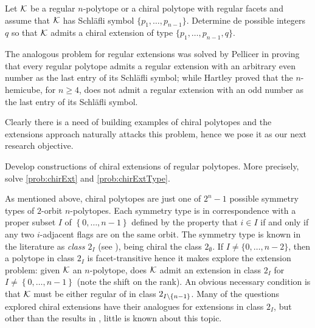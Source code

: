 \documentclass[a4paper,12pt,english]{article}
\begin{document}
\begin{problem} \label{prob:chirExtType}
  Let $\mathcal{K}$ be a regular $n$-polytope or a chiral polytope with regular facets and assume that $\mathcal{K}$ has Schläfli symbol $\{p_{1}, \dots, p_{n-1}\}$. Determine de possible integers $q$ so that $\mathcal{K}$ admits a chiral extension of type $\{p_{1}, \dots, p_{n-1}, q\}$.
\end{problem}


The analogous problem for regular extensions was solved by Pellicer in \cite{Pellicer2010_ExtensionsDuallyBipartite,Pellicer2009_ExtensionsRegularPolytopes} proving that every regular polytope admits a regular extension with an arbitrary even number as the last entry of its Schläfli symbol; while Hartley proved that the $n$-hemicube, for $n \geq 4$, does not admit a regular extension with an odd number as the last entry of its Schläfli symbol.


Clearly there is a need of building examples of chiral polytopes and the extensions approach naturally attacks this problem, hence we pose it as our next research objective.

\begin{obj}\label{obj:chirExt}
  Develop constructions of chiral extensions of regular polytopes. 
  More precisely, solve \cref{prob:chirExt} and \cref{prob:chirExtType}.
\end{obj}

As mentioned above, chiral polytopes are just one of  $2^{n}-1$ possible symmetry types of $2$-orbit $n$-polytopes.
Each symmetry type is in correspondence with a proper subset $I$ of $\left\{ 0, \dots, n-1 \right\} $ defined by the property that $i \in I$ if and only if any two $i$-adjacent flags are on the same orbit.
The symmetry type is known in the literature as \emph{class $2_{I}$ } (see \cite{PellPotTol2019_ExistenceResultTwo,Matteo2016_TwoOrbitConvex,Hubard2010_TwoOrbitPolyhedra}), being chiral  the class $2_{\emptyset}$.
If $I \neq \{0, \dots, n-2\}$, then a polytope in class $2_{I} $ is facet-transitive hence it makes explore the extension problem: given $\mathcal{K}$ an $n$-polytope, does $\mathcal{K}$ admit an extension in class $2_{I}$ for $I \neq \left\{ 0, \dots, n-1 \right\} $ (note the shift on the rank).
An obvious necessary condition is that $\mathcal{K}$ must be either regular of in class $2_{I\setminus\left\{ n-1  \right\}}$.
Many of the questions explored chiral extensions have their analogues for extensions in class $2_{I}$, but other than the results in \cite{PellPotTol2019_ExistenceResultTwo}, little is known about this topic.
\end{document}
